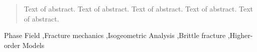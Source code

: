 \begin{abstract}
Text of abstract. Text of abstract. Text of abstract. Text of abstract. Text of abstract. 
\end{abstract}

\begin{keyword}
Phase Field \sep Fracture mechanics \sep Isogeometric Analysis \sep Brittle fracture \sep Higher-order Models
\end{keyword}